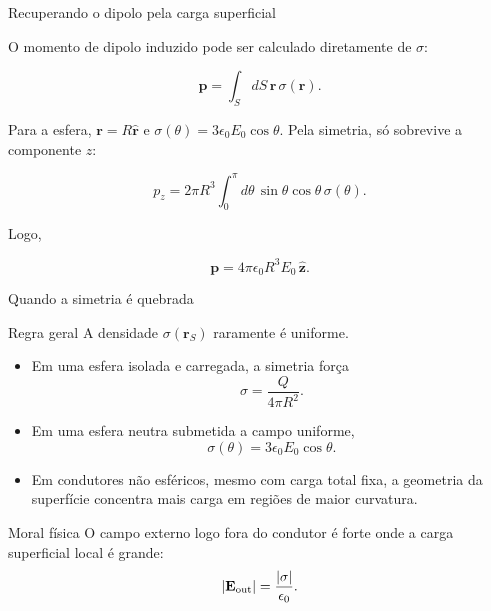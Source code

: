 \documentclass[aspectratio=169]{beamer}
\begin{document}
\begin{frame}{Recuperando o dipolo pela carga superficial}

\small

O momento de dipolo induzido pode ser calculado diretamente de \(\sigma\):

\begin{eqbox}
\begin{equation}
\mathbf p
=
\int_S dS\,
\mathbf r\,\sigma(\mathbf r).
\tag{5.17}
\label{eq:dipolo-superficial-522}
\end{equation}
\end{eqbox}

Para a esfera, \(\mathbf r=R\hat{\mathbf r}\) e
\(\sigma(\theta)=3\epsilon_0E_0\cos\theta\). Pela simetria, só sobrevive a
componente \(z\):

\[
p_z
=
2\pi R^3
\int_0^\pi
d\theta\,
\sin\theta\cos\theta\,
\sigma(\theta).
\]

Logo,

\begin{eqbox}
\begin{equation}
\mathbf p
=
4\pi\epsilon_0 R^3 E_0\,\hat{\mathbf z}.
\label{eq:dipolo-esfera-integral-sigma}
\end{equation}
\end{eqbox}

\end{frame}

\begin{frame}{Quando a simetria é quebrada}

\small

\begin{mybox}{Regra geral}
A densidade \(\sigma(\mathbf r_S)\) raramente é uniforme.
\end{mybox}

\begin{itemize}
\item Em uma esfera isolada e carregada, a simetria força
\[
\sigma=\frac{Q}{4\pi R^2}.
\]

\item Em uma esfera neutra submetida a campo uniforme,
\[
\sigma(\theta)=3\epsilon_0E_0\cos\theta.
\]

\item Em condutores não esféricos, mesmo com carga total fixa, a geometria da
superfície concentra mais carga em regiões de maior curvatura.
\end{itemize}

\begin{alertblock}{Moral física}
O campo externo logo fora do condutor é forte onde a carga superficial local é
grande:
\[
|\mathbf E_{\rm out}|=\frac{|\sigma|}{\epsilon_0}.
\]
\end{alertblock}

\end{frame}
\end{document}
